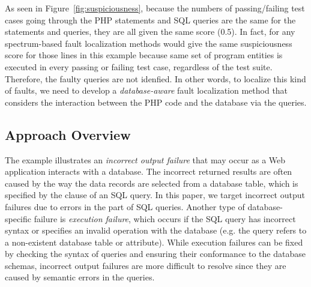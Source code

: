 As seen in Figure~\ref{fig:suspiciousness}, because the numbers of
passing/failing test cases going through the PHP statements and SQL
queries are the same for the statements and queries, they are all
given the same score (0.5). In fact, for any spectrum-based fault
localization methods would give the same suspiciousness score for
those lines in this example because same set of program entities is
executed in every passing or failing test case, regardless of the test
suite. Therefore, the faulty queries are not idenfied. In other words,
to localize this kind of faults, we need to develop a {\em
  database-aware} fault localization method that considers the
interaction between the PHP code and the database via the queries.


\subsection{Approach Overview}

The example illustrates an \emph{incorrect output failure} that may
occur as a Web application interacts with a database. The incorrect
returned results are often caused by the way the data records are
selected from a database table, which is specified by the
 clause of an SQL  query. In this paper, we
target incorrect output failures due to errors in the 
part of SQL queries. Another type of database-specific failure is
\emph{execution failure}, which occurs if the SQL query has incorrect
syntax or specifies an invalid operation with the database (e.g. the
query refers to a non-existent database table or attribute). While
execution failures can be fixed by checking the syntax of queries and
ensuring their conformance to the database schemas, incorrect output
failures are more difficult to resolve since they are caused by
semantic errors in the queries.

